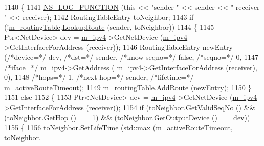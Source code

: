 \begin{DoxyCode}
1140 \{
1141   \hyperlink{log-macros-disabled_8h_a90b90d5bad1f39cb1b64923ea94c0761}{NS\_LOG\_FUNCTION} (\textcolor{keyword}{this} << \textcolor{stringliteral}{"sender "} << sender << \textcolor{stringliteral}{" receiver "} << receiver);
1142   RoutingTableEntry toNeighbor;
1143   \textcolor{keywordflow}{if} (!\hyperlink{classns3_1_1aodv_1_1RoutingProtocol_a4e1003a34c8adc96db71096d88c98ae0}{m\_routingTable}.\hyperlink{classns3_1_1aodv_1_1RoutingTable_a90cbc8a2c65cd68ccdaf768fcbb5d723}{LookupRoute} (sender, toNeighbor))
1144     \{
1145       Ptr<NetDevice> dev = \hyperlink{classns3_1_1aodv_1_1RoutingProtocol_aee33006b1f9d8b24d4722037ff3fec98}{m\_ipv4}->GetNetDevice (\hyperlink{classns3_1_1aodv_1_1RoutingProtocol_aee33006b1f9d8b24d4722037ff3fec98}{m\_ipv4}->GetInterfaceForAddress (receiver));
1146       RoutingTableEntry newEntry (\textcolor{comment}{/*device=*/} dev, \textcolor{comment}{/*dst=*/} sender, \textcolor{comment}{/*know seqno=*/} \textcolor{keyword}{false}, \textcolor{comment}{/*seqno=*/} 0,
1147                                               \textcolor{comment}{/*iface=*/} \hyperlink{classns3_1_1aodv_1_1RoutingProtocol_aee33006b1f9d8b24d4722037ff3fec98}{m\_ipv4}->GetAddress (
      \hyperlink{classns3_1_1aodv_1_1RoutingProtocol_aee33006b1f9d8b24d4722037ff3fec98}{m\_ipv4}->GetInterfaceForAddress (receiver), 0),
1148                                               \textcolor{comment}{/*hops=*/} 1, \textcolor{comment}{/*next hop=*/} sender, \textcolor{comment}{/*lifetime=*/} 
      \hyperlink{classns3_1_1aodv_1_1RoutingProtocol_a37ec921ef1c48e4d8e7072fe989613d2}{m\_activeRouteTimeout});
1149       \hyperlink{classns3_1_1aodv_1_1RoutingProtocol_a4e1003a34c8adc96db71096d88c98ae0}{m\_routingTable}.\hyperlink{classns3_1_1aodv_1_1RoutingTable_a579e562e38e67d510de1ff2c87806c76}{AddRoute} (newEntry);
1150     \}
1151   \textcolor{keywordflow}{else}
1152     \{
1153       Ptr<NetDevice> dev = \hyperlink{classns3_1_1aodv_1_1RoutingProtocol_aee33006b1f9d8b24d4722037ff3fec98}{m\_ipv4}->GetNetDevice (\hyperlink{classns3_1_1aodv_1_1RoutingProtocol_aee33006b1f9d8b24d4722037ff3fec98}{m\_ipv4}->GetInterfaceForAddress (receiver));
1154       \textcolor{keywordflow}{if} (toNeighbor.GetValidSeqNo () && (toNeighbor.GetHop () == 1) && (toNeighbor.GetOutputDevice () == 
      dev))
1155         \{
1156           toNeighbor.SetLifeTime (\hyperlink{80211b_8c_affe776513b24d84b39af8ab0930fef7f}{std::max} (\hyperlink{classns3_1_1aodv_1_1RoutingProtocol_a37ec921ef1c48e4d8e7072fe989613d2}{m\_activeRouteTimeout}, toNeighbor.

\end{DoxyCode}
